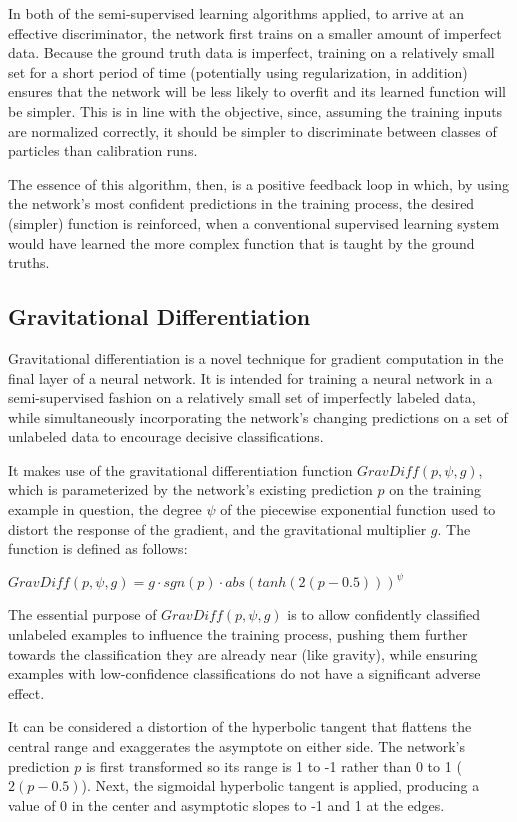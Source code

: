 \documentclass[10pt]{article}
\begin{document}
In both of the semi-supervised learning algorithms applied, to arrive at an effective discriminator, the network first trains on a smaller amount of imperfect data. Because the ground truth data is imperfect, training on a relatively small set for a short period of time (potentially using regularization, in addition) ensures that the network will be less likely to overfit and its learned function will be simpler. This is in line with the objective, since, assuming the training inputs are normalized correctly, it should be simpler to discriminate between classes of particles than calibration runs.

The essence of this algorithm, then, is a positive feedback loop in which, by using the network's most confident predictions in the training process, the desired (simpler) function is reinforced, when a conventional supervised learning system would have learned the more complex function that is taught by the ground truths.

\subsection{Gravitational Differentiation}

Gravitational differentiation is a novel technique for gradient computation in the final layer of a neural network. It is intended for training a neural network in a semi-supervised fashion on a relatively small set of imperfectly labeled data, while simultaneously incorporating the network's changing predictions on a set of unlabeled data to encourage decisive classifications.

It makes use of the gravitational differentiation function $GravDiff(p, \psi, g)$, which is parameterized by the network's existing prediction $p$ on the training example in question, the degree $\psi$ of the piecewise exponential function used to distort the response of the gradient, and the gravitational multiplier $g$. The function is defined as follows:

$GravDiff(p, \psi, g) = g \cdot sgn(p) \cdot abs(tanh(2(p - 0.5))) ^ \psi$

The essential purpose of $GravDiff(p, \psi, g)$ is to allow confidently classified unlabeled examples to influence the training process, pushing them further towards the classification they are already near (like gravity), while ensuring examples with low-confidence classifications do not have a significant adverse effect.

It can be considered a distortion of the hyperbolic tangent that flattens the central range and exaggerates the asymptote on either side. The network's prediction $p$ is first transformed so its range is 1 to -1 rather than 0 to 1 ($2(p - 0.5)$). Next, the sigmoidal hyperbolic tangent is applied, producing a value of 0 in the center and asymptotic slopes to -1 and 1 at the edges.
\end{document}
